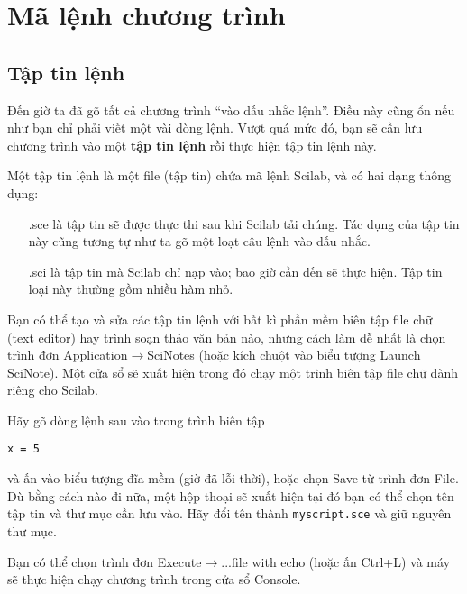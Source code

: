 \documentclass[12pt]{book}
\begin{document}
\chapter{Mã lệnh chương trình}

\section{Tập tin lệnh}

Đến giờ ta đã gõ tất cả chương trình ``vào dấu nhắc lệnh''. Điều này
cũng ổn nếu như bạn chỉ phải viết một vài dòng lệnh. Vượt quá
mức đó, bạn sẽ cần lưu chương trình vào một {\bf tập tin lệnh} rồi
thực hiện tập tin lệnh này.

Một tập tin lệnh là một file (tập tin) chứa mã lệnh Scilab, và có hai dạng
thông dụng:
\begin{itemize}
\item[.sce] là tập tin sẽ được thực thi sau khi Scilab tải chúng. Tác dụng
của tập tin này cũng tương tự như ta gõ một loạt câu lệnh vào dấu nhắc.
\item[.sci] là tập tin mà Scilab chỉ nạp vào; bao giờ cần đến sẽ thực hiện.
Tập tin loại này thường gồm nhiều hàm nhỏ.
\end{itemize}

Bạn có thể tạo và sửa các tập tin lệnh với bất kì phần mềm biên tập
file chữ (text editor) hay trình soạn thảo văn bản nào, nhưng cách làm
dễ nhất là chọn trình đơn {\sf Application}$\rightarrow${\sf SciNotes}
(hoặc kích chuột vào biểu tượng Launch SciNote). 
Một cửa sổ sẽ xuất hiện trong đó chạy một trình biên tập
file chữ dành riêng cho Scilab.

Hãy gõ dòng lệnh sau vào trong trình biên tập 

\begin{verbatim}
x = 5
\end{verbatim}
%
\noindent và ấn vào biểu tượng đĩa mềm (giờ đã lỗi thời), hoặc chọn {\sf Save}
từ trình đơn {\sf File}. Dù bằng cách nào đi nữa, một hộp thoại sẽ 
xuất hiện tại đó bạn có thể chọn tên tập tin và thư mục cần lưu vào. 
Hãy đổi tên thành {\tt myscript.sce} và giữ nguyên thư mục.


Bạn có thể chọn trình đơn {\sf Execute}$\rightarrow${\sf ...file with echo}
(hoặc ấn Ctrl+L) và máy sẽ thực hiện chạy chương trình trong cửa sổ
Console. 
\end{document}
